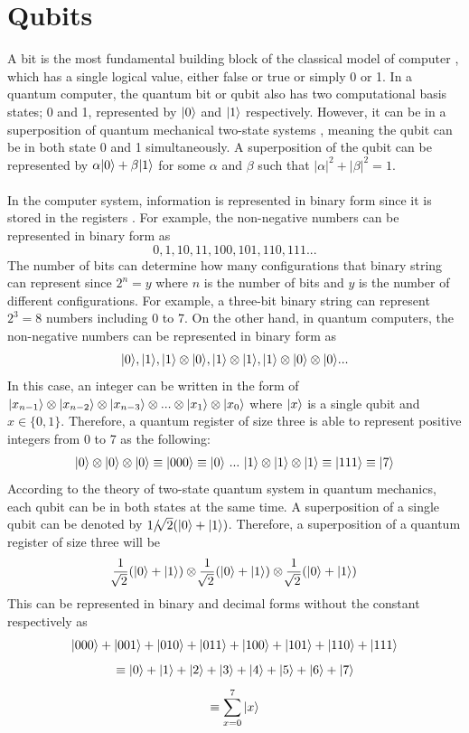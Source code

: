 \documentclass[12pt]{third-rep}
\begin{document}
\section{Qubits}
A bit is the most fundamental building block of the classical model of computer \cite{qc-history}, which has a single logical value, either false or true or simply 0 or 1. In a quantum computer, the quantum bit or qubit also has two computational basis states; 0 and 1, represented by ${\left\vert{0}\right\rangle}$ and ${\left\vert{1}\right\rangle}$ respectively. However, it can be in a superposition of quantum mechanical two-state systems \cite{qc-states}, meaning the qubit can be in both state 0 and 1 simultaneously. A superposition of the qubit can be represented by $\alpha{\left\vert{0}\right\rangle}+\beta{\left\vert{1}\right\rangle}$ for some $\alpha$ and $\beta$ such that $|\alpha|^2+|\beta|^2=1$. \\\\
In the computer system, information is represented in binary form since it is stored in the registers \cite{qc-concepts}. For example, the non-negative numbers can be represented in binary form as
$$0,1,10,11,100,101,110,111...$$
The number of bits can determine how many configurations that binary string can represent since $2^n=y$ where $n$ is the number of bits and $y$ is the number of different configurations. For example, a three-bit binary string can represent $2^3=8$ numbers including 0 to 7. On the other hand, in quantum computers, the non-negative numbers can be represented in binary form as
$${\left\vert{0}\right\rangle},{\left\vert{1}\right\rangle},{\left\vert{1}\right\rangle}\otimes{\left\vert{0}\right\rangle},{\left\vert{1}\right\rangle}\otimes{\left\vert{1}\right\rangle},{\left\vert{1}\right\rangle}\otimes{\left\vert{0}\right\rangle}\otimes{\left\vert{0}\right\rangle}...$$
In this case, an integer can be written in the form of ${\left\vert{x_{n-1}}\right\rangle}\otimes{\left\vert{x_{n-2}}\right\rangle}\otimes{\left\vert{x_{n-3}}\right\rangle}\otimes...\otimes{\left\vert{x_1}\right\rangle}\otimes{\left\vert{x_0}\right\rangle}$ where ${\left\vert{x}\right\rangle}$ is a single qubit and $x\in\{0,1\}$. Therefore, a quantum register of size three is able to represent positive integers from 0 to 7 as the following:
$$\ket{0}\otimes\ket{0}\otimes\ket{0}\equiv\ket{000}\equiv\ket{0} \ ...\ \ket{1}\otimes\ket{1}\otimes\ket{1}\equiv\ket{111}\equiv\ket{7}$$
According to the theory of two-state quantum system in quantum mechanics, each qubit can be in both states at the same time. A superposition of a single qubit can be denoted by $1/\sqrt[]{2}({\left\vert{0}\right\rangle}+{\left\vert{1}\right\rangle})$. Therefore, a superposition of a quantum register of size three will be
$$\frac{1}{\sqrt[]{2}}({\left\vert{0}\right\rangle}+{\left\vert{1}\right\rangle})\otimes\frac{1}{\sqrt[]{2}}({\left\vert{0}\right\rangle}+{\left\vert{1}\right\rangle})\otimes\frac{1}{\sqrt[]{2}}({\left\vert{0}\right\rangle}+{\left\vert{1}\right\rangle})$$
This can be represented in binary and decimal forms without the constant respectively as
$${\left\vert{000}\right\rangle}+{\left\vert{001}\right\rangle}+{\left\vert{010}\right\rangle}+{\left\vert{011}\right\rangle}+{\left\vert{100}\right\rangle}+{\left\vert{101}\right\rangle}+{\left\vert{110}\right\rangle}+{\left\vert{111}\right\rangle}$$
$$\equiv{\left\vert{0}\right\rangle}+{\left\vert{1}\right\rangle}+{\left\vert{2}\right\rangle}+{\left\vert{3}\right\rangle}+{\left\vert{4}\right\rangle}+{\left\vert{5}\right\rangle}+{\left\vert{6}\right\rangle}+{\left\vert{7}\right\rangle}$$
$$\equiv\sum_{x=0}^{7}{\left\vert{x}\right\rangle}$$
\end{document}
